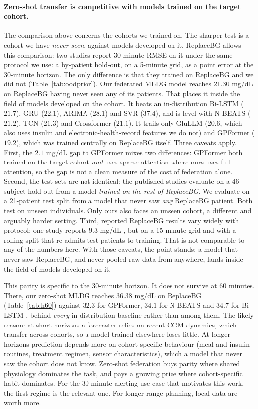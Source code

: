 \documentclass[10pt,letterpaper]{article}
\begin{document}
\paragraph{Zero-shot transfer is competitive with models trained on the target
cohort.} The comparison above concerns the cohorts we trained on. The sharper
test is a cohort we have \emph{never seen}, against models developed on it.
ReplaceBG allows this comparison: two studies report 30-minute RMSE on it
under the same protocol we use: a by-patient hold-out, on a 5-minute grid,
as a point error at the 30-minute horizon. The only difference is that they
trained on ReplaceBG and we did not (Table~\ref{tab:oodprior}). Our federated
MLDG model reaches $21.30$ mg/dL on ReplaceBG having never seen any of its
patients. That places it inside the field of models developed on the cohort.
It beats an in-distribution Bi-LSTM ($21.7$), GRU ($22.1$), ARIMA ($28.1$)
and SVR ($37.4$), and is level with N-BEATS ($21.2$), TCN ($21.3$) and
Crossformer ($21.1$). It trails only GluLLM ($20.6$, which also uses insulin
and electronic-health-record features we do not) and GPFormer ($19.2$), which
was trained centrally on ReplaceBG itself. Three caveats apply. First, the
$2.1$ mg/dL gap to GPFormer mixes two differences: GPFormer both trained on
the target cohort \emph{and} uses sparse attention where ours uses full
attention, so the gap is not a clean measure of the cost of federation alone.
Second, the test sets are not identical: the published studies evaluate on a
46-subject hold-out from a model \emph{trained on the rest of ReplaceBG}. We
evaluate on a 21-patient test split from a model that never saw \emph{any}
ReplaceBG patient. Both test on unseen individuals. Only ours also faces an
unseen cohort, a different and arguably harder setting. Third, reported
ReplaceBG results vary widely with protocol: one study reports $9.3$ mg/dL
\cite{jaloli2023cnnlstm}, but on a 15-minute grid and with a rolling split
that re-admits test patients to training. That is not comparable to any of
the numbers here. With those caveats, the point stands: a model that never
saw ReplaceBG, and never pooled raw data from anywhere, lands inside the
field of models developed on it.

This parity is specific to the 30-minute horizon. It does not survive at 60
minutes. There, our zero-shot MLDG reaches $36.38$ mg/dL on ReplaceBG
(Table~\ref{tab:h60}) against $32.3$ for GPFormer, $34.1$ for N-BEATS and
$34.7$ for Bi-LSTM \cite{zhu2024gpformer}, behind \emph{every}
in-distribution baseline rather than among them. The likely reason: at short
horizons a forecaster relies on recent CGM dynamics, which transfer across
cohorts, so a model trained elsewhere loses little. At longer horizons
prediction depends more on cohort-specific behaviour (meal and insulin
routines, treatment regimen, sensor characteristics), which a model that
never saw the cohort does not know. Zero-shot federation buys parity where
shared physiology dominates the task, and pays a growing price where
cohort-specific habit dominates. For the 30-minute alerting use case that
motivates this work, the first regime is the relevant one. For longer-range
planning, local data are worth more.
\end{document}
